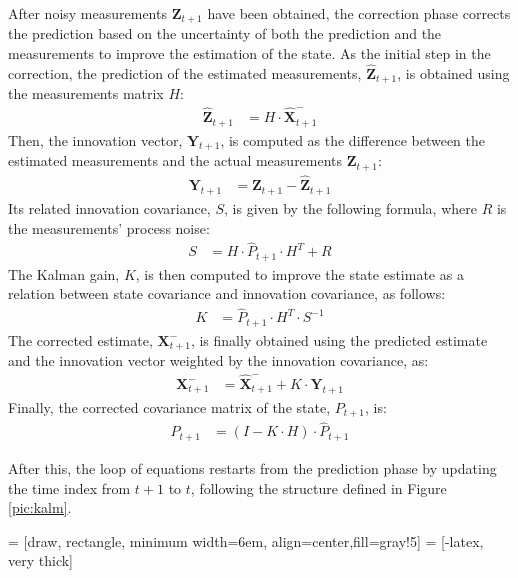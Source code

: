 After noisy measurements $\mathbf{Z}_{t+1}$ have been obtained, the correction phase corrects the prediction based on the uncertainty of both the prediction and the measurements to improve the estimation of the state.
As the initial step in the correction, the prediction of the estimated measurements, $\hat{\mathbf{Z}}_{t+1}$, is obtained using the measurements matrix $H$:
    \begin{align}
    \hat{\mathbf{Z}}_{t+1} & = H \cdot \hat{\mathbf{X}}_{t+1}^-
    \label{eq:pred-measure}
    \end{align}
Then, the innovation vector, $\mathbf{Y}_{t+1}$, is computed as the difference between the estimated measurements and the actual measurements $\mathbf{Z}_{t+1}$:
    \begin{align}
    \mathbf{Y}_{t+1} & = \mathbf{Z}_{t+1} - \hat{\mathbf{Z}}_{t+1}
    \end{align}
Its related innovation covariance, $S$, is given by the following formula, where $R$ is the measurements' process noise:
    \begin{align}
    S & = H \cdot \hat{P}_{t+1} \cdot H^T + R
    \end{align}
The Kalman gain, $K$, is then computed to improve the state estimate as a relation between state covariance and innovation covariance, as follows:
    \begin{align}
    K & = \hat{P}_{t+1} \cdot H^T \cdot S^{-1}
    \end{align}
The corrected estimate, $\mathbf{X}_{t+1}^-$, is finally obtained using the predicted estimate and the innovation vector weighted by the innovation covariance, as:%
    \begin{align}
    \mathbf{X}_{t+1}^- & = \hat{\mathbf{X}}_{t+1}^- + K \cdot \mathbf{Y}_{t+1}
    \label{eq:correct-state}
    \end{align}
Finally, the corrected covariance matrix of the state, $P_{t+1}$, is:%
    \begin{align}
    	\label{eq:standard-corr-cov}
    P_{t+1} & = (I - K \cdot H) \cdot \hat{P}_{t+1}
    \end{align}

After this, the loop of equations restarts from the prediction phase by updating the time index from $t+1$ to $t$, following the structure defined in Figure \ref{pic:kalm}.

 = [draw, rectangle, minimum width=6em, align=center,fill=gray!5]
 = [-latex, very thick]
\newcommand*{\tran}{\top}

